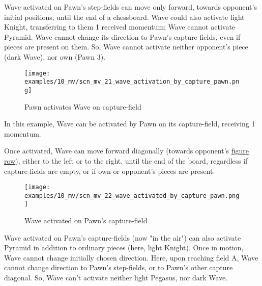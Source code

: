 Wave activated on Pawn's step-fields can move only forward, towards opponent's
initial positions, until the end of a chessboard. Wave could also activate light
Knight, transferring to them 1 received momentum; Wave cannot activate Pyramid.
Wave cannot change its direction to Pawn's capture-fields, even if pieces are
present on them. So, Wave cannot activate neither opponent's piece (dark Wave),
nor own (Pawn 3).

\clearpage %

\vspace*{-2.1\baselineskip}
\noindent
\begin{figure}[!h]
\texttt{[image: examples/10\_mv/scn\_mv\_21\_wave\_activation\_by\_capture\_pawn.png]}
\caption{Pawn activates Wave on capture-field}
\label{fig:scn_mv_21_wave_activation_by_capture_pawn}
\end{figure}

In this example, Wave can be activated by Pawn on its capture-field, receiving 1 momentum.

Once activated, Wave can move forward diagonally (towards opponent's
\hyperref[sec:Terms/Figure row]{figure row}), either to the left or to the right, until the
end of the board, regardless if capture-fields are empty, or if own or opponent's pieces are
present.

\clearpage %

\vspace*{-2.1\baselineskip}
\noindent
\begin{figure}[!h]
\texttt{[image: examples/10\_mv/scn\_mv\_22\_wave\_activated\_by\_capture\_pawn.png]}
\caption{Wave activated on Pawn's capture-field}
\label{fig:scn_mv_22_wave_activated_by_capture_pawn}
\end{figure}

Wave activated on Pawn's capture-fields (now "in the air") can also activate Pyramid
in addition to ordinary pieces (here, light Knight). Once in motion, Wave cannot
change initially chosen direction. Here, upon reaching field A, Wave cannot change
direction to Pawn's step-fields, or to Pawn's other capture diagonal. So, Wave can't
activate neither light Pegasus, nor dark Wave.

\clearpage %

